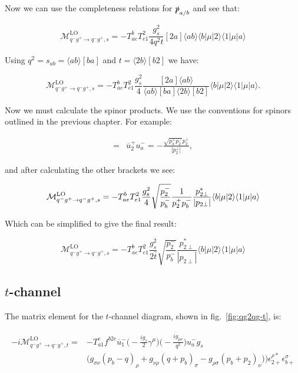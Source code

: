 		Now we can use the completeness relations for $\slashed p_{a/b}$ and see that:

		\begin{equation}
			\mathcal{M}_{q^-g^+\to q^-g^+, s}^{\text{LO}}=-T^b_{ae}T^2_{e1}\frac{g^2_s}{4q^2t}[2a]\langle ab\rangle\langle{b}|\mu|2\rangle\langle{1}|\mu|a\rangle
		\end{equation}

		Using $q^2=s_{ab}=\langle ab\rangle[ba]$ and $t=\langle2b\rangle[b2]$ we have:

		\begin{equation}
		\mathcal{M}_{q^-g^+\to q^-g^+, s}^{\text{LO}}=-T^b_{ae}T^2_{e1}\frac{g^2_s}{4}\frac{[2a]\langle ab\rangle}{\langle ab\rangle[ba]
		\langle2b\rangle[b2]}\langle{b}|\mu|2\rangle\langle{1}|\mu|a\rangle.
		\end{equation}

		Now we must calculate the spinor products.  We use the conventions for spinors outlined in the
		previous chapter.  For example:

		\begin{align}
			[2a] = &\overline{u}^+_2u^-_a=-\frac{\sqrt{p_a^+p_2^-}p_2^\perp}{|p_2^\perp|},
		\end{align}

		and after calculating the other brackets we see:

		\begin{equation}
			\mathcal{M}_{q^-g^+\to q^-g^+, s}^{\text{LO}} = -T^b_{ae}T^2_{e1}\frac{g_s^2}{4}\sqrt{\frac{p_2^-}{p_b^-}}\frac{1}{p_2^+p_b^-} \frac{p_{2\perp}^*}{|p_{2\perp}|} \langle b | \mu | 2 \rangle \langle 1 | \mu | a \rangle
		\end{equation}

		Which can be simplified to give the final result:

		\begin{equation}
			\mathcal{M}_{q^-g^+\to q^-g^+, s}^{\text{LO}}=-T^b_{ae}T^2_{e1}\frac{g_s^2}{2\hat{t}}\sqrt{\frac{p_2^-}{p_b^-}}\frac{p_{2\perp}^*}
			{|p_{2\perp}|}\langle{b}|\mu|2\rangle\langle{1}|\mu|a\rangle
			\label{eqn:s-channel}
		\end{equation}

	\subsection{$t$-channel}

		The matrix element for the $t$-channel diagram, shown in fig.~\eqref{fig:qg2qg-t}, is:

		\begin{align}
		\begin{split}
			-i\mathcal{M}_{q^-g^+\to q^-g^+, t}^{\text{LO}} =
			&-T^e_{a1}f^{b2e}\overline{u}^-_1\Bigg(-\frac{ig_s}{2}\gamma^\mu\Bigg)\Bigg(-\frac{ig_{\mu\nu}}{q^2}\Bigg)u^-_ag_s\\
			&\Big(g_{\sigma\nu}(p_b-q)_\rho + g_{\nu\rho}(q+p_b)_\sigma - g_{\rho\sigma}(p_b+p_2)_\nu)\Big)\epsilon^{\rho *}_{2+}\epsilon^{\sigma}_{b+}\\
		\end{split}
		\end{align}

